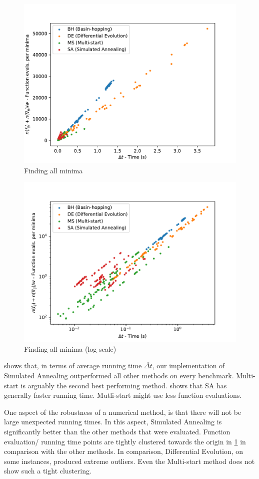 \begin{figure}
    \center
    \caption{Finding all minima}
    \label{fig:compare1}
    \includegraphics[scale=0.5]{figures/compare1-1.pdf}
\end{figure}

\begin{figure}
    \center
    \caption{Finding all minima (log scale)}
    \label{fig:compare-log}
    \includegraphics[scale=0.5]{figures/compare1-2.pdf}
\end{figure}

 shows that, in terms of average running time $\overline{\Delta t}$,
our implementation of Simulated Annealing outperformed all other methods on every benchmark. Multi-start is arguably
the second best performing method.  shows that SA has generally faster running time. Mutli-start
might use less function evaluations.

One aspect of the robustness of a numerical method, is that there will not be large unexpected running times. In this
aspect, Simulated Annealing is significantly better than the other methods that were evaluated. Function evaluation/
running time points are tightly clustered towards the origin in \cref{fig:compare1} in comparison with the other methods.
In comparison, Differential Evolution, on some instances, produced extreme outliers. Even the Multi-start method
does not show such a tight clustering.

